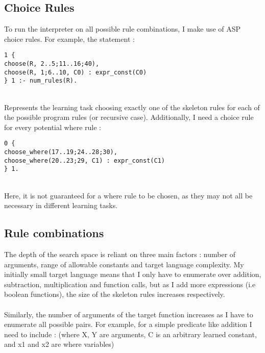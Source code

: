 \subsection{Choice Rules}
To run the interpreter on all possible rule combinations, I make use of ASP choice rules. For example, the statement :

\begin{lstlisting}
1 {
choose(R, 2..5;11..16;40),
choose(R, 1;6..10, C0) : expr_const(C0)
} 1 :- num_rules(R).
\end{lstlisting}
\mbox{} \\
Represents the learning task choosing exactly one of the skeleton rules for each of the possible program rules (or recursive case). Additionally, I need a choice rule for every potential where rule : 

\begin{lstlisting}
0 {
choose_where(17..19;24..28;30),
choose_where(20..23;29, C1) : expr_const(C1)
} 1.
\end{lstlisting}
\mbox{} \\
Here, it is not guaranteed for a where rule to be chosen, as they may not all be necessary in different learning tasks. 

\subsection{Rule combinations}
The depth of the search space is reliant on three main factors : number of arguments, range of allowable constants and target language complexity. My initially small target language means that I only have to enumerate over addition, subtraction, multiplication and function calls, but as I add more expressions (i.e boolean functions), the size of the skeleton rules increases respectively. \\ \\
Similarly, the number of arguments of the target function increases as I have to enumerate all possible pairs. For example, for a simple predicate like addition I need to include : (where X, Y are arguments, C is an arbitrary learned constant, and x1 and x2 are where variables) 

